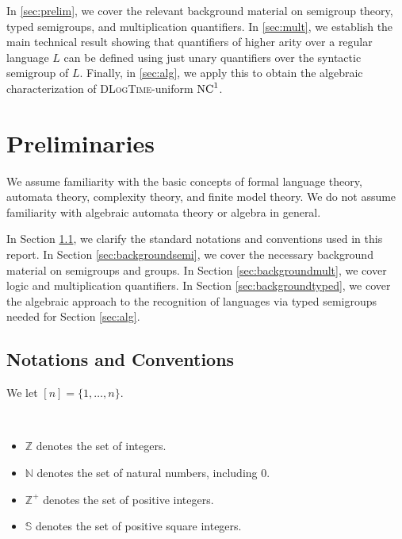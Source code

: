 \documentclass[a4paper,UKenglish,cleveref, autoref, thm-restate, anonymous]{lipics-v2021}
\begin{document}
In \autoref{sec:prelim}, we cover the relevant background material on semigroup theory, typed semigroups, and multiplication quantifiers.   In \autoref{sec:mult}, we establish the main technical result showing that quantifiers of higher arity over a regular language $L$ can be defined using just unary quantifiers over the syntactic semigroup of $L$.  Finally, in \autoref{sec:alg}, we apply this to obtain the algebraic characterization of \textsc{DLogTime}-uniform $\mathrm{NC}^1$.



\section{Preliminaries}\label{sec:prelim}

We assume familiarity with the basic concepts of formal language theory, automata theory, complexity theory, and finite model theory. We do not assume familiarity with algebraic automata theory or algebra in general. 

In Section \ref{sec:backgroundconv}, we clarify the standard notations and conventions used in this report. In Section \ref{sec:backgroundsemi}, we cover the necessary background material on semigroups and groups. In Section \ref{sec:backgroundmult}, we cover logic and multiplication quantifiers. In Section \ref{sec:backgroundtyped}, we cover the algebraic approach to the recognition of languages via typed semigroups needed for Section \ref{sec:alg}.

\subsection{Notations and Conventions}\label{sec:backgroundconv}

\begin{definition}
    We let $[n] = \{1, \dots, n\}$.
\end{definition}

\begin{definition}
    \,
    \begin{itemize}
        \item $\mathbb{Z}$ denotes the set of integers.
        \item $\mathbb{N}$ denotes the set of natural numbers, including 0.
        \item $\mathbb{Z}^+$ denotes the set of positive integers.
        \item $\mathbb{S}$ denotes the set of positive square integers.
    \end{itemize}
\end{definition}
\end{document}
